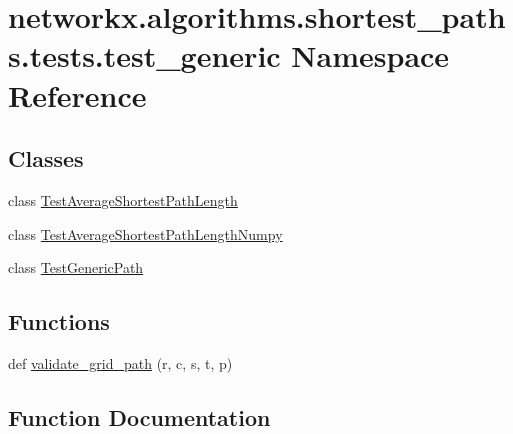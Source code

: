 \hypertarget{namespacenetworkx_1_1algorithms_1_1shortest__paths_1_1tests_1_1test__generic}{}\section{networkx.\+algorithms.\+shortest\+\_\+paths.\+tests.\+test\+\_\+generic Namespace Reference}
\label{namespacenetworkx_1_1algorithms_1_1shortest__paths_1_1tests_1_1test__generic}
\subsection*{Classes}
\begin{DoxyCompactItemize}
\item 
class \hyperlink{classnetworkx_1_1algorithms_1_1shortest__paths_1_1tests_1_1test__generic_1_1TestAverageShortestPathLength}{Test\+Average\+Shortest\+Path\+Length}
\item 
class \hyperlink{classnetworkx_1_1algorithms_1_1shortest__paths_1_1tests_1_1test__generic_1_1TestAverageShortestPathLengthNumpy}{Test\+Average\+Shortest\+Path\+Length\+Numpy}
\item 
class \hyperlink{classnetworkx_1_1algorithms_1_1shortest__paths_1_1tests_1_1test__generic_1_1TestGenericPath}{Test\+Generic\+Path}
\end{DoxyCompactItemize}
\subsection*{Functions}
\begin{DoxyCompactItemize}
\item 
def \hyperlink{namespacenetworkx_1_1algorithms_1_1shortest__paths_1_1tests_1_1test__generic_a8f33969b6205d27896e00c429787909a}{validate\+\_\+grid\+\_\+path} (r, c, s, t, p)
\end{DoxyCompactItemize}


\subsection{Function Documentation}
\mbox{\label{namespacenetworkx_1_1algorithms_1_1shortest__paths_1_1tests_1_1test__generic_a8f33969b6205d27896e00c429787909a}} 
